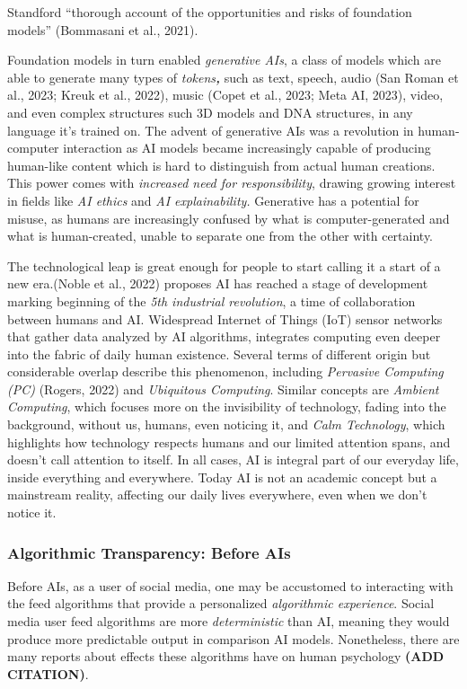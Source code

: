\documentclass[
  letterpaper,
  DIV=11,
  numbers=noendperiod]{scrartcl}
\begin{document}
Standford ``thorough account of the opportunities and risks of
foundation models'' (Bommasani et al., 2021).

Foundation models in turn enabled \emph{generative AIs}, a class of
models which are able to generate many types of \emph{tokens\textbf{,}}
such as text, speech, audio (San Roman et al., 2023; Kreuk et al.,
2022), music (Copet et al., 2023; Meta AI, 2023), video, and even
complex structures such 3D models and DNA structures, in any language
it's trained on. The advent of generative AIs was a revolution in
human-computer interaction as AI models became increasingly capable of
producing human-like content which is hard to distinguish from actual
human creations. This power comes with \emph{increased need for
responsibility}, drawing growing interest in fields like \emph{AI
ethics} and \emph{AI explainability.} Generative has a potential for
misuse, as humans are increasingly confused by what is
computer-generated and what is human-created, unable to separate one
from the other with certainty.

The technological leap is great enough for people to start calling it a
start of a new era.(Noble et al., 2022) proposes AI has reached a stage
of development marking beginning of the \emph{5th industrial
revolution}, a time of collaboration between humans and AI. Widespread
Internet of Things (IoT) sensor networks that gather data analyzed by AI
algorithms, integrates computing even deeper into the fabric of daily
human existence. Several terms of different origin but considerable
overlap describe this phenomenon, including \emph{Pervasive Computing
(PC)} (Rogers, 2022) and \emph{Ubiquitous Computing}. Similar concepts
are \emph{Ambient Computing}, which focuses more on the invisibility of
technology, fading into the background, without us, humans, even
noticing it, and \emph{Calm Technology}, which highlights how technology
respects humans and our limited attention spans, and doesn't call
attention to itself. In all cases, AI is integral part of our everyday
life, inside everything and everywhere. Today AI is not an academic
concept but a mainstream reality, affecting our daily lives everywhere,
even when we don't notice it.

\subsubsection{Algorithmic Transparency: Before
AIs}\label{algorithmic-transparency-before-ais}

Before AIs, as a user of social media, one may be accustomed to
interacting with the feed algorithms that provide a personalized
\emph{algorithmic experience}. Social media user feed algorithms are
more \emph{deterministic} than AI, meaning they would produce more
predictable output in comparison AI models. Nonetheless, there are many
reports about effects these algorithms have on human psychology
\textbf{(ADD CITATION)}.
\end{document}
